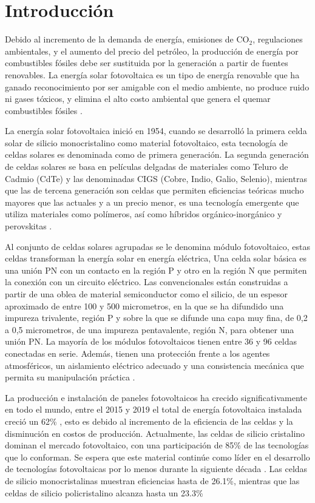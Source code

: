 
\section{Introducción}
\label{sec:Introducción}

Debido al incremento de la demanda de energía, emisiones de CO$_{2}$, regulaciones ambientales, y el aumento del precio del petróleo, la producción de energía por combustibles fósiles debe ser sustituida por la generación a partir de fuentes renovables. La energía solar fotovoltaica es un tipo de energía renovable que ha ganado reconocimiento por ser amigable con el medio ambiente, no produce ruido ni gases tóxicos, y elimina el alto costo ambiental que genera el quemar combustibles fósiles \citep{Kim2012}. 

La energía solar fotovoltaica inició en 1954, cuando se desarrolló la primera celda solar de silicio monocristalino como material fotovoltaico, esta tecnología de celdas solares es denominada como de primera generación. La segunda generación de celdas solares se basa en películas delgadas de materiales como Teluro de Cadmio (CdTe) y las denominadas CIGS (Cobre, Indio, Galio, Selenio), mientras que las de tercena generación son celdas que permiten eficiencias teóricas mucho mayores que las actuales y a un precio menor, es una tecnología emergente que utiliza materiales como polímeros, así como híbridos orgánico-inorgánico y perovskitas \citep{Oyola2007}.

Al conjunto de celdas solares agrupadas se le denomina módulo fotovoltaico, estas celdas transforman la energía solar en energía eléctrica,  Una celda solar básica es una unión PN con un contacto en la región P y otro en la región N que permiten la conexión con un circuito eléctrico. Las convencionales están construidas a partir de una oblea de material semiconductor como el silicio, de un espesor aproximado de entre 100 y 500 micrometros, en la que se ha difundido una impureza trivalente, región P y sobre la que se difunde una capa muy fina, de 0,2 a 0,5 micrometros, de una impureza pentavalente, región N, para obtener una unión PN. La mayoría de los módulos fotovoltaicos tienen entre 36 y 96 celdas conectadas en serie. Además, tienen una protección frente a los agentes atmosféricos, un aislamiento eléctrico adecuado y una consistencia mecánica que permita su manipulación práctica \citep{Florencia2013}.

La producción e instalación de paneles fotovoltaicos ha crecido significativamente en todo el mundo, entre el 2015 y 2019 el total de energía fotovoltaica instalada creció un 62\% \citep{IRENA2019}, esto es debido al incremento de la eficiencia de las celdas y la disminución en costos de producción. Actualmente, las celdas de silicio cristalino dominan el mercado fotovoltaico, con una participación de 85\% de las tecnologías que lo conforman. Se espera que este material continúe como líder en el desarrollo de tecnologías fotovoltaicas por lo menos durante la siguiente década \citep{Oyola2007}. Las celdas de silicio monocristalinas muestran eficiencias hasta de 26.1\%, mientras que las celdas de silicio policristalino alcanza hasta un 23.3\% \citep{NREL2020}

